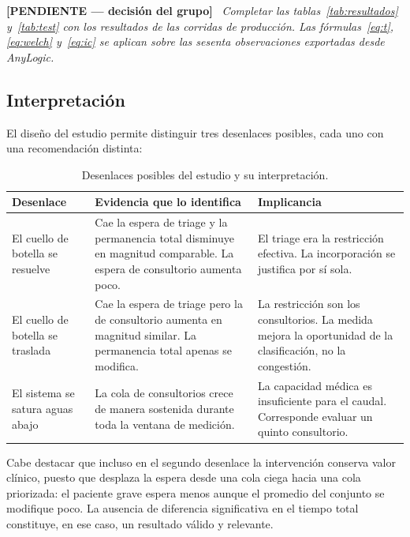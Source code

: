 \documentclass{article}
\newenvironment{pendiente}
  {\par\medskip\noindent\begingroup\color{red!65!black}%
   \textbf{[PENDIENTE — decisión del grupo]}\ \itshape}
  {\endgroup\par\medskip}
\begin{document}
\begin{pendiente}
Completar las tablas~\ref{tab:resultados} y~\ref{tab:test} con los resultados
de las corridas de producción. Las fórmulas~\eqref{eq:t},
\eqref{eq:welch} y~\eqref{eq:ic} se aplican sobre las sesenta observaciones
exportadas desde AnyLogic.
\end{pendiente}

\subsection{Interpretación}

El diseño del estudio permite distinguir tres desenlaces posibles, cada uno
con una recomendación distinta:

\begin{table}[H]
\centering
\small
\begin{tabular}{p{3.6cm}p{5.0cm}p{5.0cm}}
\toprule
\textbf{Desenlace} & \textbf{Evidencia que lo identifica} & \textbf{Implicancia} \\
\midrule
El cuello de botella se resuelve &
Cae la espera de triage y la permanencia total disminuye en magnitud
comparable. La espera de consultorio aumenta poco. &
El triage era la restricción efectiva. La incorporación se justifica por sí
sola. \\
El cuello de botella se traslada &
Cae la espera de triage pero la de consultorio aumenta en magnitud similar.
La permanencia total apenas se modifica. &
La restricción son los consultorios. La medida mejora la oportunidad de la
clasificación, no la congestión. \\
El sistema se satura aguas abajo &
La cola de consultorios crece de manera sostenida durante toda la ventana de
medición. &
La capacidad médica es insuficiente para el caudal. Corresponde evaluar un
quinto consultorio. \\
\bottomrule
\end{tabular}
\caption{Desenlaces posibles del estudio y su interpretación.}
\end{table}

Cabe destacar que incluso en el segundo desenlace la intervención conserva
valor clínico, puesto que desplaza la espera desde una cola ciega hacia una
cola priorizada: el paciente grave espera menos aunque el promedio del
conjunto se modifique poco. La ausencia de diferencia significativa en el
tiempo total constituye, en ese caso, un resultado válido y relevante.

\end{document}
